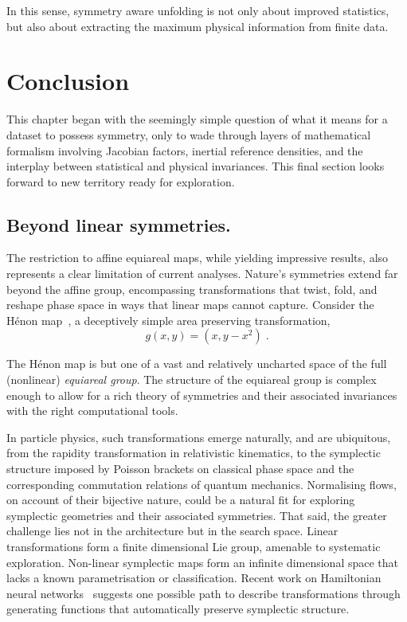         In this sense, symmetry aware unfolding is not only about improved statistics, but also about extracting the maximum physical information from finite data.

\section{Conclusion}
\label{sec:symmetrygan-conclusion}
\chapterminitoc
    This chapter began with the seemingly simple question of what it means for a dataset to possess symmetry, only to wade through layers of mathematical formalism involving Jacobian factors, inertial reference densities, and the interplay between statistical and physical invariances.
    This final section looks forward to new territory ready for exploration.

    \subsection{Beyond linear symmetries.}
        The restriction to affine equiareal maps, while yielding impressive results, also represents a clear limitation of current analyses.
        Nature's symmetries extend far beyond the affine group, encompassing transformations that twist, fold, and reshape phase space in ways that linear maps cannot capture.
        Consider the H\'enon map~\cite{ibanez_simple_1976}, a deceptively simple area preserving transformation,
        \[
            g(x,y) = (x, y - x^2)\;.
        \]
        
         The H\'enon map is but one of a vast and relatively uncharted space of the full (nonlinear) \emph{equiareal group}.
        The structure of the equiareal group is complex enough to allow for a rich theory of symmetries and their associated invariances with the right computational tools.
        
        In particle physics, such transformations emerge naturally, and are ubiquitous, from the rapidity transformation in relativistic kinematics, to the symplectic structure imposed by Poisson brackets on classical phase space and the corresponding commutation relations of quantum mechanics.
        Normalising flows, on account of their bijective nature, could be a natural fit for exploring symplectic geometries and their associated symmetries.
        That said, the greater challenge lies not in the architecture but in the search space.
        Linear transformations form a finite dimensional Lie group, amenable to systematic exploration.
        Non-linear symplectic maps form an infinite dimensional space that lacks a known parametrisation or classification.
        Recent work on Hamiltonian neural networks~\cite{greydanus_hamiltonian_2019} suggests one possible path to describe transformations through generating functions that automatically preserve symplectic structure.

